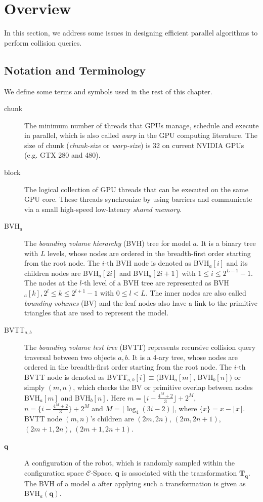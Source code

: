 \section{Overview}
\label{sec:5:overview}
In this section, we address
some issues in designing efficient parallel algorithms to perform collision queries.

\subsection{Notation and Terminology}
We define some terms and symbols used in the rest of this chapter.
\begin{description}
\item[chunk] The minimum number of threads that GPUs manage, schedule and execute in parallel, which is also called \emph{warp} in the GPU computing literature. The size of chunk (\emph{chunk-size} or \emph{warp-size}) is 32 on current NVIDIA GPUs (e.g. GTX 280 and 480).
\item[block] The logical collection of GPU threads that can be executed on the same GPU core. These threads synchronize by using barriers
and communicate via a small high-speed low-latency \emph{shared memory}.
\item[BVH$_a$] The \emph{bounding volume hierarchy} (BVH) tree for model $a$. It is a binary tree with $L$ levels, whose nodes are ordered in the breadth-first order starting from the root node. The $i$-th BVH node is denoted as BVH$_a[i]$ and its children nodes are
BVH$_a[2i]$ and BVH$_a[2i+1]$ with $1\leq i \leq 2^{L-1}-1$. The nodes at the $l$-th level of a BVH tree are represented as
BVH$_a[k], 2^l \leq k \leq 2^{l+1} - 1$ with $0
\leq l < L$. The inner nodes are also called \emph{bounding volumes} (BV) and the leaf nodes also have a link to the primitive
triangles that are used to represent the model.
\item[BVTT$_{a,b}$] The \emph{bounding volume test tree} (BVTT) represents recursive collision query traversal between two
objects $a, b$. It is a 4-ary tree, whose nodes are ordered in the breadth-first order starting from the root node. The $i$-th BVTT node is denoted as BVTT$_
{a,b}[i]\equiv ($BVH$_a[m]$, BVH$_b[n])$ or simply $(m, n)$, which checks the BV or primitive overlap between nodes BVH$_a[m]$ and BVH$_b[n]$. Here $m = \lfloor i - \frac{4^M + 2}{3} \rfloor + 2^M$, $n = \{i - \frac{4^M + 2}{3}\} + 2^M$ and $M = \lfloor \log_4(3i -
2) \rfloor$, where $\{x\} = x - \lfloor x \rfloor$. BVTT node $(m, n)$'s children are $(2m, 2n)$, $(2m, 2n+1)$, $(2m+1,2n)$, $(2m+1,2n+1)$.
\item[$\mathbf{q}$] A configuration of the robot, which is randomly sampled within the
configuration space $\mathcal{C}$-Space.  $\mathbf{q}$ is associated with the transformation $\mathbf{T}_{\mathbf{q}}$.
The BVH of a model $a$ after applying such a transformation is given as BVH$_a(\mathbf{q})$.
\end{description}


